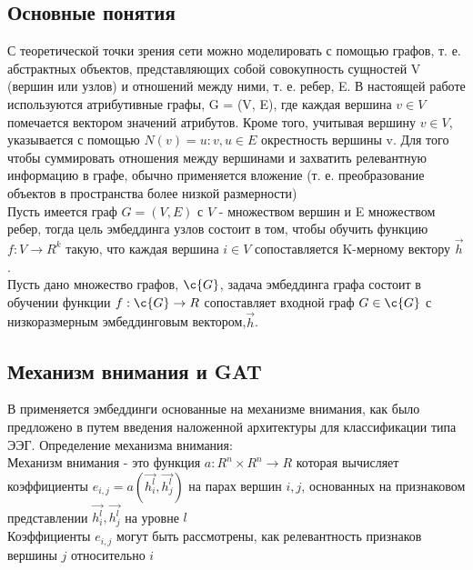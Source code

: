 \documentclass[12pt, a4paper, titlepage]{extreport}
\begin{document}
	\subsection*{Основные понятия}
	С теоретической точки зрения сети можно моделировать с помощью графов, т. е. абстрактных объектов, представляющих собой совокупность сущностей V (вершин или узлов) и отношений между ними, т. е. ребер, E. В настоящей работе используются атрибутивные графы, G = (V, E), где каждая вершина $v \in V$ помечается вектором значений атрибутов. Кроме того, учитывая вершину  $v \in V$, указывается с помощью
	$N (v) = {u \colon {v, u} \in E}$ окрестность вершины v. Для того чтобы суммировать отношения между вершинами и захватить релевантную информацию в графе, обычно применяется вложение (т. е. преобразование объектов в пространства более низкой размерности)\\
	Пусть имеется граф $G = (V, E)$ с $V$ - множеством вершин и E множеством ребер, тогда
	цель эмбеддинга узлов состоит в том, чтобы обучить функцию
	$f \colon V \to R^k$
	такую, что каждая вершина $i \in V$ сопоставляется K-мерному вектору $\vec{h}$.\\
	Пусть дано множество графов, $\c{G}$, 
	задача эмбеддинга графа состоит в обучении функции $f: \c{G} \to R$ сопоставляет входной граф $G \in \c{G}$ с низкоразмерным эмбеддинговым вектором,$\vec{h}$.
	\subsection*{Механизм внимания и GAT}
	В \cite{29}  применяется эмбеддинги основанные на механизме внимания, как было предложено в \cite{24} путем введения наложенной архитектуры для классификации типа ЭЭГ.
	Определение механизма внимания:\\
	Механизм внимания - это функция $a : R^n \times R^n \to R$ которая вычисляет коэффициенты
	$e_{i, j} = a(\vec{h^l_i}, \vec{h^l_j})$ на парах вершин $i, j$, основанных на признаковом представлении $\vec{h^l_i}, \vec{h^l_j}$ на уровне $l$\\
	Коэффициенты $e_{i, j}$ могут быть рассмотрены, как релевантность признаков вершины $j$ относительно $i$
\end{document}
